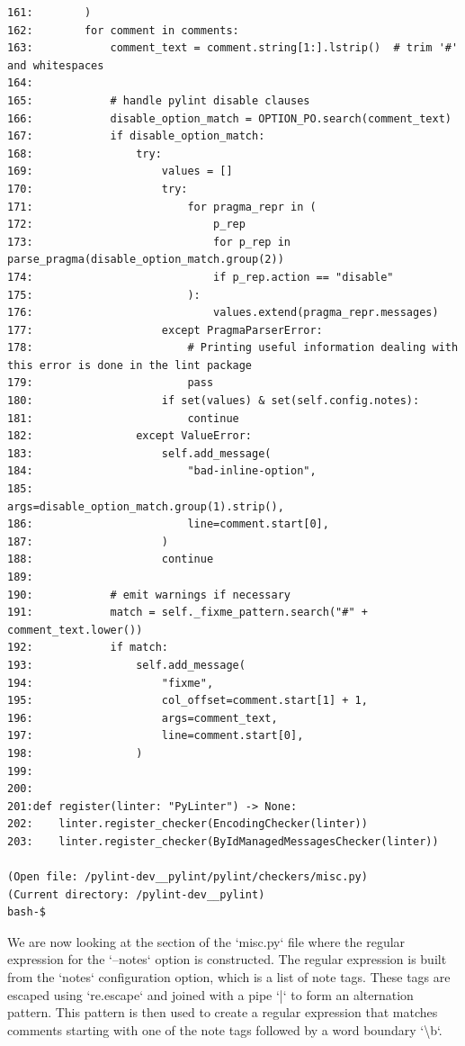 {\begin{observationbox}
\begin{Verbatim}[breaklines=true, breakanywhere=true]
161:        )
162:        for comment in comments:
163:            comment_text = comment.string[1:].lstrip()  # trim '#' and whitespaces
164:
165:            # handle pylint disable clauses
166:            disable_option_match = OPTION_PO.search(comment_text)
167:            if disable_option_match:
168:                try:
169:                    values = []
170:                    try:
171:                        for pragma_repr in (
172:                            p_rep
173:                            for p_rep in parse_pragma(disable_option_match.group(2))
174:                            if p_rep.action == "disable"
175:                        ):
176:                            values.extend(pragma_repr.messages)
177:                    except PragmaParserError:
178:                        # Printing useful information dealing with this error is done in the lint package
179:                        pass
180:                    if set(values) & set(self.config.notes):
181:                        continue
182:                except ValueError:
183:                    self.add_message(
184:                        "bad-inline-option",
185:                        args=disable_option_match.group(1).strip(),
186:                        line=comment.start[0],
187:                    )
188:                    continue
189:
190:            # emit warnings if necessary
191:            match = self._fixme_pattern.search("#" + comment_text.lower())
192:            if match:
193:                self.add_message(
194:                    "fixme",
195:                    col_offset=comment.start[1] + 1,
196:                    args=comment_text,
197:                    line=comment.start[0],
198:                )
199:
200:
201:def register(linter: "PyLinter") -> None:
202:    linter.register_checker(EncodingChecker(linter))
203:    linter.register_checker(ByIdManagedMessagesChecker(linter))

(Open file: /pylint-dev__pylint/pylint/checkers/misc.py)
(Current directory: /pylint-dev__pylint)
bash-$
\end{Verbatim}
\end{observationbox}
\begin{agentbox}
We are now looking at the section of the `misc.py` file where the regular expression for the `--notes` option is constructed. The regular expression is built from the `notes` configuration option, which is a list of note tags. These tags are escaped using `re.escape` and joined with a pipe `|` to form an alternation pattern. This pattern is then used to create a regular expression that matches comments starting with one of the note tags followed by a word boundary `{\textbackslash}b`.




\end{agentbox}}
